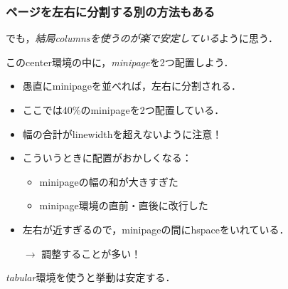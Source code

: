 \documentclass[unicode, 9pt, aspectratio=169]{beamer}
\begin{document}
\begin{frame}
\frametitle{ページを左右に分割する別の方法もある}
でも，\emph{結局columnsを使うのが楽で安定している}ように思う．

\begin{center}
このcenter環境の中に，\emph{minipage}を2つ配置しよう．
\vspace{-8pt}

\hrulefill

\begin{minipage}{.4\linewidth}
    \begin{itemize}
        \item 愚直にminipageを並べれば，左右に分割される．
        \item ここでは40\%のminipageを2つ配置している．
        \item 幅の合計がlinewidthを超えないように注意！
    \end{itemize}
\end{minipage}
%
\hspace{12pt}
%
\begin{minipage}{.4\linewidth}
\begin{itemize}
    \item こういうときに配置がおかしくなる：
    \begin{itemize}
        \item minipageの幅の和が大きすぎた
        \item minipage環境の直前・直後に改行した
    \end{itemize}
    \item 左右が近すぎるので，minipageの間にhspaceをいれている．
    \item[$\to$] 調整することが多い！
\end{itemize}
\end{minipage}
\end{center}

\hrulefill
\begin{center}
    \emph{tabular}環境を使うと挙動は安定する．
    \vspace{-8pt}

    \hrulefill


\end{center}
\end{frame}
\end{document}
